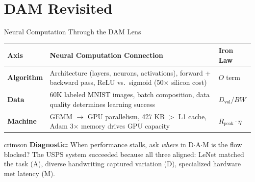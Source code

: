 \documentclass[aspectratio=169, 12pt]{beamer}
\begin{document}
\section{DAM Revisited}

\begin{frame}{Neural Computation Through the D\raisebox{0.04em}{\tiny$\bullet$}A\raisebox{0.04em}{\tiny$\bullet$}M Lens}

\scriptsize
\renewcommand{\arraystretch}{1.1}
\begin{tabular}{@{}lp{6.5cm}l@{}}
  \toprule
  \textbf{Axis} & \textbf{Neural Computation Connection} & \textbf{Iron Law} \\
  \midrule
  \textcolor{computestroke}{\textbf{Algorithm}} & Architecture (layers, neurons, activations), forward + backward pass, ReLU vs.\ sigmoid (50$\times$ silicon cost) & $O$ term \\
  \textcolor{datastroke}{\textbf{Data}} & 60K labeled MNIST images, batch composition, data quality determines learning success & $D_{\text{vol}}/BW$ \\
  \textcolor{routingstroke}{\textbf{Machine}} & GEMM $\to$ GPU parallelism, 427 KB $>$ L1 cache, Adam 3$\times$ memory drives GPU capacity & $R_{\text{peak}} \cdot \eta$ \\
  \bottomrule
\end{tabular}

\vspace{0.15cm}
\begin{mlsyscard}{crimson}
{\footnotesize \textbf{Diagnostic:} When performance stalls, ask \emph{where} in D$\cdot$A$\cdot$M is the flow blocked? The USPS system succeeded because all three aligned: LeNet matched the task (A), diverse handwriting captured variation (D), specialized hardware met latency (M).}
\end{mlsyscard}

\end{frame}
\end{document}
